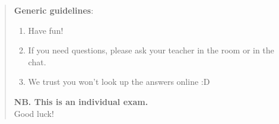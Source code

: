 \documentclass[a4paper,12pt,fleqn]{article}
\newif\ifreturnform
\newcounter{question}
\begin{document}
%
%

\newpage
\setcounter{page}{1}

\begin{quote}
  \textbf{Generic guidelines}:
  \vspace{1cm}
    \begin{enumerate}
      \ifreturnform
      \item Have fun!
      \item If you need questions, please ask your teacher in the room or 
      in the chat.
      \item We trust you won't look up the answers online :D

    \end{enumerate}

    \vspace{3cm}
    \textbf{NB. This is an individual exam.} \\
    
    Good luck!
\end{quote}
\bigskip
\end{document}
